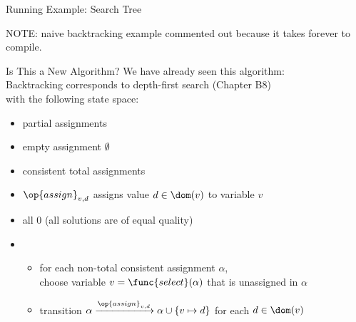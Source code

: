 \begin{frame}{Running Example: Search Tree}
\end{frame}

\else

\begin{frame}
  NOTE: naive backtracking example commented out because it takes
  forever to compile.
\end{frame}
\fi

\begin{frame}{Is This a New Algorithm?}
  We have already seen this algorithm: \\ \alert{Backtracking
    corresponds to depth-first search} (Chapter B8) \\ with the
  following state space:
  \begin{itemize}
  \item {} partial assignments
  \item {} empty assignment $\emptyset$
  \item {} consistent total assignments
  \item {} $\op{assign}_{v,d}$ assigns value $d \in
  \dom(v)$ to variable $v$
  \item {} all 0 (all solutions are of equal quality)
  \item {}
    \begin{itemize}
    \item for each \alert{non-total consistent} assignment $\alpha$, \\choose variable
      $v = \func{select}(\alpha)$ that is unassigned in $\alpha$
    \item transition $\alpha \xrightarrow{\op{assign}_{v,d}} \alpha
      \cup \{v \mapsto d\}$ for each $d \in \dom(v)$
    \end{itemize}
  \end{itemize}
\end{frame}

